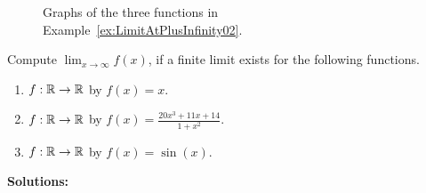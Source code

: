 \begin{figure}[htb]%
\centering
{}%
\hspace{5pt}%
\centering
{}%
\centering
{}%
    \caption[]{Graphs of the three functions in Example~\ref{ex:LimitAtPlusInfinity02}.}
    \label{fig:ConvergingToFiniteLimitspart2}
\end{figure}

\bigskip


\begin{example} 
\label{ex:LimitAtPlusInfinity02}
Compute $\displaystyle \lim_{x \to \infty} f(x)$, if a finite limit exists for the following functions. 

\begin{enumerate}
\renewcommand{\labelenumi}{(\alph{enumi})}
\setlength{\itemsep}{.2cm}
    \item   $f:\mathbb R \to \mathbb R$ by $f(x) = x$.
     \item  $f:\mathbb R \to \mathbb R$ by $f(x) = \frac{20 x^3 + 11 x + 14}{1 + x^2}$.
    \item  $f:\mathbb R \to \mathbb R$ by $f(x) = \sin(x)$.
\end{enumerate} 
    
\end{example}

\textbf{Solutions:}

